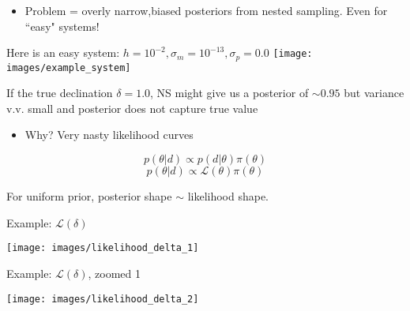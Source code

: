\documentclass[10pt]{beamer}
\title{}
\subtitle{}
\author{}
\date{EE/GW meeting, May 11, 2023}
\begin{document}
	
	\maketitle
	
	\begin{frame}{}
	
	\begin{itemize}
		\item \alert{Problem = overly narrow,biased posteriors from nested sampling}. Even for ``easy" systems!
	\end{itemize}

Here is an easy system: $h = 10^{-2}, \sigma_m = 10^{-13}, \sigma_p = 0.0$ \newline 
\centering
\texttt{[image: images/example\_system]}


\raggedright
If the true declination $\delta = 1.0$, NS might give us a posterior of $\sim 0.95$ but variance v.v. small and posterior does not capture true value


\end{frame}




	\begin{frame}{}
	
	\begin{itemize}
		\item Why? Very nasty likelihood curves
	\end{itemize}
	
	
	$$  p(\theta | d) \propto p(d | \theta) \pi({\theta})$$
	$$ p(\theta | d) \propto \mathcal{L}(\theta) \pi({\theta})$$
	
		
	For uniform prior, posterior shape $\sim$ likelihood shape. 


\end{frame}



\begin{frame}{}
	
	Example: $\mathcal{L}(\delta)$
	
\texttt{[image: images/likelihood\_delta\_1]}
	
	
\end{frame}

\begin{frame}{}
	
	Example: $\mathcal{L}(\delta)$, zoomed 1
	
	\texttt{[image: images/likelihood\_delta\_2]}
	
	
\end{frame}
\end{document}

